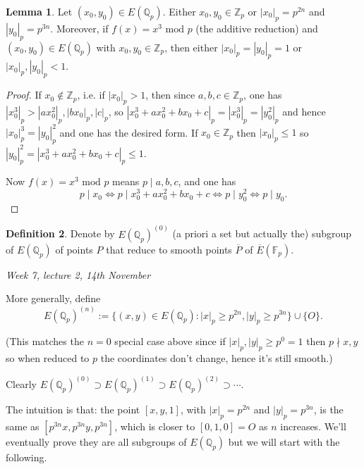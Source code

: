\documentclass{article}
\newcommand{\F}{\mathbb{F}}
\newcommand{\Z}{\mathbb{Z}}
\newcommand{\Q}{\mathbb{Q}}
\newcommand{\Mod}{\text{ mod }}
\theoremstyle{definition}
\newtheorem{defn}{Definition}[subsection]
\newtheorem{lemma}[defn]{Lemma}
\begin{document}
\begin{lemma}
\label{lemma:eitherxyinZporp2np3n}
Let $(x_0,y_0)\in E(\Q_p)$. Either $x_0,y_0\in\Z_p$ or $|x_0|_p=p^{2n}$ and $|y_0|_p=p^{3n}$. Moreover, if $f(x)=x^3\Mod p$ (the additive reduction) and $(x_0,y_0)\in E(\Q_p)$ with $x_0,y_0\in\Z_p$, then either $|x_0|_p=|y_0|_p=1$ or $|x_0|_p,|y_0|_p<1$.
\end{lemma}
\begin{proof}
If $x_0\notin\Z_p$, i.e. if $|x_0|_p>1$, then since $a,b,c\in\Z_p$, one has $|x_0^3|_p>|ax_0^2|_p,|bx_0|_p,|c|_p$, so $|x_0^3+ax_0^2+bx_0+c|_p=|x_0^3|_p=|y_0^2|_p$ and hence $|x_0|_p^3=|y_0|_p^2$ and one has the desired form. If $x_0\in\Z_p$ then $|x_0|_p\leq 1$ so $|y_0|_p^2=|x_0^3+ax_0^2+bx_0+c|_p\leq 1$.

Now $f(x)=x^3\Mod p$ means $p\mid a,b,c$, and one has
\[
p\mid x_0\iff p\mid x_0^3+ax_0^2+bx_0+c\iff p\mid y_0^2\iff p\mid y_0.
\]
\end{proof}

\begin{defn}
Denote by $E(\Q_p)^{(0)}$ (a priori a set but actually the) subgroup of $E(\Q_p)$ of points $P$ that reduce to smooth points $\overline P$ of $\overline E(\F_p)$.

\begin{flushright}
\textit{Week 7, lecture 2, 14th November}
\end{flushright}

More generally, define
\[
E(\Q_p)^{(n)}:=\{(x,y)\in E(\Q_p):|x|_p\geq p^{2n},|y|_p\geq p^{3n}\}\cup\{O\}.
\]

(This matches the $n=0$ special case above since if $|x|_p,|y|_p\geq p^0=1$ then $p\nmid x,y$ so when reduced to $p$ the coordinates don't change, hence it's still smooth.)

Clearly $E(\Q_p)^{(0)}\supset E(\Q_p)^{(1)}\supset E(\Q_p)^{(2)}\supset\cdots$.
\end{defn}

The intuition is that: the point $[x,y,1]$, with $|x|_p=p^{2n}$ and $|y|_p=p^{3n}$, is the same as $\left[p^{3n}x,p^{3n}y,p^{3n}\right]$, which is closer to $[0,1,0]=O$ as $n$ increases. We'll eventually prove they are all subgroups of $E(\Q_p)$ but we will start with the following.
\end{document}
